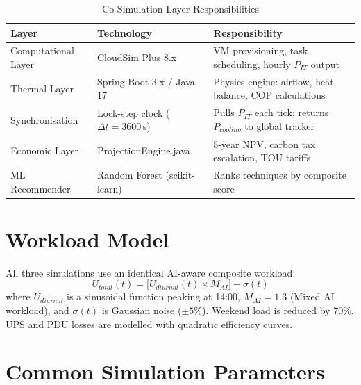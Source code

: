 \documentclass[12pt,a4paper]{report}
\begin{document}
\begin{table}[H]
\centering
\caption{Co-Simulation Layer Responsibilities}
\label{tab:arch_layers}
\renewcommand{\arraystretch}{1.3}
\begin{tabular}{p{3.5cm}p{5cm}p{5.5cm}}
\toprule
\textbf{Layer} & \textbf{Technology} & \textbf{Responsibility} \\
\midrule
Computational Layer & CloudSim Plus 8.x & VM provisioning, task scheduling, hourly $P_{IT}$ output \\
Thermal Layer & Spring Boot 3.x / Java 17 & Physics engine: airflow, heat balance, COP calculations \\
Synchronisation & Lock-step clock ($\Delta t = 3600$\,s) & Pulls $P_{IT}$ each tick; returns $P_{cooling}$ to global tracker \\
Economic Layer & ProjectionEngine.java & 5-year NPV, carbon tax escalation, TOU tariffs \\
ML Recommender & Random Forest (scikit-learn) & Ranks techniques by composite score \\
\bottomrule
\end{tabular}
\end{table}

\section{Workload Model}

All three simulations use an identical AI-aware composite workload:
\begin{equation}
U_{total}(t) = \bigl[U_{diurnal}(t) \times M_{AI}\bigr] + \sigma(t)
\label{eq:workload}
\end{equation}
where $U_{diurnal}$ is a sinusoidal function peaking at 14:00, $M_{AI} = 1.3$ (Mixed AI workload),
and $\sigma(t)$ is Gaussian noise ($\pm 5\%$). Weekend load is reduced by 70\%.
UPS and PDU losses are modelled with quadratic efficiency curves.

\section{Common Simulation Parameters}
\end{document}
